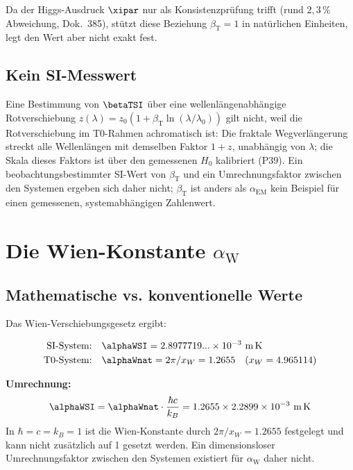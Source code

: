 	Da der Higgs-Ausdruck $\xipar$ nur als Konsistenzprüfung trifft (rund $2{,}3\,\%$ Abweichung, Dok.~385), stützt diese Beziehung $\beta_{\text{T}} = 1$ in natürlichen Einheiten, legt den Wert aber nicht exakt fest.
	
	\subsection{Kein SI-Messwert}
	\label{subsec:beta_zirkularitaet}
	
	Eine Bestimmung von $\betaTSI$ über eine wellenlängenabhängige Rotverschiebung $z(\lambda) = z_0\left(1 + \beta_{\text{T}} \ln(\lambda/\lambda_0)\right)$ gilt nicht, weil die Rotverschiebung im T0-Rahmen achromatisch ist: Die fraktale Wegverlängerung streckt alle Wellenlängen mit demselben Faktor $1+z$, unabhängig von $\lambda$; die Skala dieses Faktors ist über den gemessenen $H_0$ kalibriert (P39). Ein beobachtungsbestimmter SI-Wert von $\beta_{\text{T}}$ und ein Umrechnungsfaktor zwischen den Systemen ergeben sich daher nicht; $\beta_{\text{T}}$ ist anders als $\alpha_{\text{EM}}$ kein Beispiel für einen gemessenen, systemabhängigen Zahlenwert.
	
	\section{Die Wien-Konstante $\alpha_{\text{W}}$}
	\label{sec:alpha_w}
	
	\subsection{Mathematische vs. konventionelle Werte}
	\label{subsec:wien_werte}
	
	Das Wien-Verschiebungsgesetz ergibt:
	
	\begin{align}
		\text{SI-System:} \quad &\alphaWSI = 2.8977719...\times10^{-3}~\text{m\,K} \\
		\text{T0-System:} \quad &\alphaWnat = 2\pi/x_W = 1.2655 \quad (x_W = 4.965114)
	\end{align}
	
	\textbf{Umrechnung:}
	$$\alphaWSI = \alphaWnat\cdot\frac{\hbar c}{k_B} = 1.2655 \times 2.2899\times10^{-3}~\text{m\,K}$$
	In $\hbar = c = k_B = 1$ ist die Wien-Konstante durch $2\pi/x_W = 1.2655$ festgelegt und kann nicht zusätzlich auf 1 gesetzt werden. Ein dimensionsloser Umrechnungsfaktor zwischen den Systemen existiert für $\alpha_{\text{W}}$ daher nicht.
	

